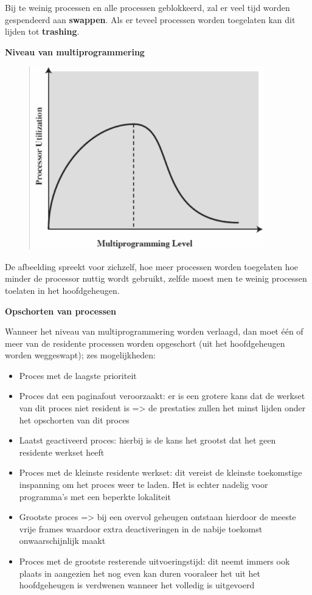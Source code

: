 Bij te weinig processen en alle processen geblokkeerd, zal er veel tijd worden gespendeerd aan \textbf{swappen}. Als er teveel processen worden toegelaten kan dit lijden tot \textbf{trashing}.

\textbf{Niveau van multiprogrammering}


\begin{figure}[htp]
    \centering
            \includegraphics[width=4in]{img/procesbelasting}
        \caption{}
    \label{fig:}
\end{figure}

De afbeelding spreekt voor zichzelf, hoe meer processen worden toegelaten hoe minder de processor nuttig wordt gebruikt, zelfde moest men te weinig processen toelaten in het hoofdgeheugen.


\textbf{Opschorten van processen}

Wanneer het niveau van multiprogrammering worden verlaagd, dan moet één of meer van de residente processen worden opgeschort (uit het hoofdgeheugen worden weggeswapt); zes mogelijkheden:

\begin{itemize}
\item Proces met de laagste prioriteit
\item Proces dat een paginafout veroorzaakt: er is een grotere kans dat de werkset van dit proces niet resident is => de prestaties zullen het minst lijden onder het opschorten van dit proces
\item Laatst geactiveerd proces: hierbij is de kans het grootst dat het geen residente werkset heeft
\item Proces met de kleinste residente werkset: dit vereist de kleinste toekomstige inspanning om het proces weer te laden. Het is echter nadelig voor programma's met een beperkte lokaliteit
\item Grootste proces => bij een overvol geheugen ontstaan hierdoor de meeste vrije frames waardoor extra deactiveringen in de nabije toekomst onwaarschijnlijk maakt
\item Proces met de grootste resterende uitvoeringstijd: dit neemt immers ook plaats in aangezien het nog even kan duren vooraleer het uit het hoofdgeheugen is verdwenen wanneer het volledig is uitgevoerd
\end{itemize}